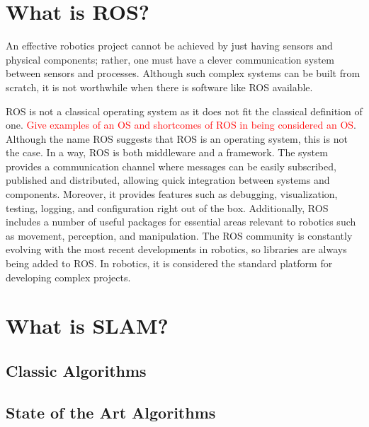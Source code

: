 \section{What is \acs{ROS}?}

An effective robotics project cannot be achieved by just having sensors and physical components; rather, one must have a clever communication system between sensors and processes. Although such complex systems can be built from scratch, it is not worthwhile when there is software like \acs*{ROS} available.

\acs{ROS} is not a classical operating system as it does not fit the classical definition of one. \textcolor{red}{Give examples of an OS and shortcomes of ROS in being considered an OS}. Although the name \acl*{ROS} suggests that ROS is an operating system, this is not the case. In a way, \acs*{ROS} is both middleware and a framework. The system provides a communication channel where messages can be easily subscribed, published and distributed, allowing quick integration between systems and components. Moreover, it provides features such as debugging, visualization, testing, logging, and configuration right out of the box. Additionally, ROS includes a number of useful packages for essential areas relevant to robotics such as movement, perception, and manipulation. The ROS community is constantly evolving with the most recent developments in robotics, so libraries are always being added to ROS. In robotics, it is considered the standard platform for developing complex projects.

\section{What is SLAM?}

\subsection{Classic Algorithms}

\subsection{State of the Art Algorithms}

\cite{bond_fires_2017}